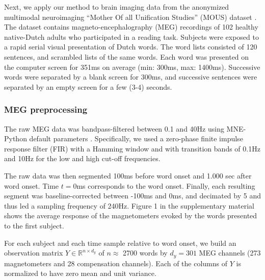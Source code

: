 
Next, we apply our method to brain imaging data from the anonymized multimodal
neuroimaging ``Mother Of all Unification Studies'' (MOUS) dataset
\citep{schoffelen2019204}. The dataset contains magneto-encephalography (MEG)
recordings of 102 healthy native-Dutch adults who participated in a reading
task.
%
Subjects were exposed to a rapid serial visual presentation of Dutch words. The
word lists consisted of 120 sentences, and scrambled lists of the same words.
Each word was presented on the computer screen for 351ms on average (min: 300ms,
max: 1400ms). Successive words were separated by a blank screen for 300ms, and
successive sentences were separated by an empty screen for a few (3-4) seconds.

\subsubsection{MEG preprocessing}

The raw MEG data was bandpass-filtered between 0.1 and 40Hz using MNE-Python
default parameters \citep{gramfort2013meg, gramfort2014mne}. Specifically, we used a zero-phase finite impulse
response filter (FIR) with a Hamming window and with transition bands of 0.1Hz
and 10Hz for the low and high cut-off frequencies.

The raw data was then segmented 100ms before word onset and 1.000 sec after
word onset. Time $t=0$ms corresponds to the word onset. Finally, each resulting
segment was baseline-corrected between -100ms and 0ms, and decimated by 5 and
thus led a sampling frequency of 240Hz. Figure 1 in the supplementary material
shows the average response of the magnetometers evoked by the words presented
to the first subject.

For each subject and each time sample relative to word onset, we
build an observation matrix $Y \in \mathbb{R}^{n \times d_y}$ of $n\approx$ 2700 words
by $d_y=301$ MEG channels (273 magnetometers and 28 compensation channels). Each
of the columns of $Y$ is normalized to have zero mean and unit variance.

